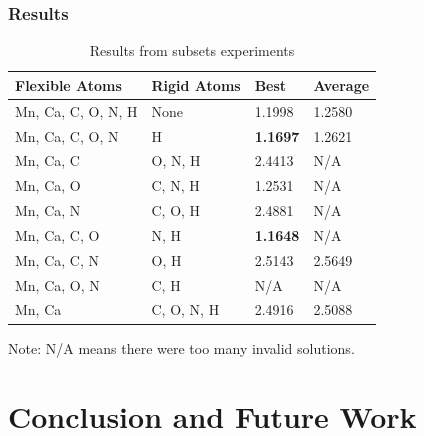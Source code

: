 \documentclass[10pt]{beamer}
\begin{document}
\begin{frame}
	\frametitle{Results}

	\begin{table}
		\caption{Results from subsets experiments}
		\begin{tabular}{ | l | l | l | l | }
			\hline
			Flexible Atoms & Rigid Atoms & Best & Average \\ \hline \hline
			Mn, Ca, C, O, N, H & None & 1.1998 & 1.2580 \\ \hline
			Mn, Ca, C, O, N & H & \textbf{1.1697} & 1.2621 \\ \hline
			Mn, Ca, C & O, N, H & 2.4413 & N/A \\ \hline
			Mn, Ca, O & C, N, H & 1.2531 & N/A \\ \hline
			Mn, Ca, N & C, O, H & 2.4881 & N/A \\ \hline
			Mn, Ca, C, O & N, H & \textbf{1.1648} & N/A \\ \hline
			Mn, Ca, C, N & O, H & 2.5143 & 2.5649 \\ \hline
			Mn, Ca, O, N & C, H & N/A & N/A \\ \hline
			Mn, Ca & C, O, N, H & 2.4916 & 2.5088 \\ \hline
		\end{tabular}
	\end{table}

	Note: N/A means there were too many invalid solutions.

\end{frame}

\section{Conclusion and Future Work}

\end{document}
